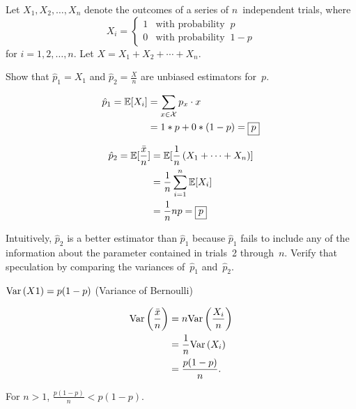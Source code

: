 \begin{problem}
  Let ${X_1,X_2,\ldots,X_n}$  denote the outcomes of a series of $n$~independent trials, where
  \begin{equation*}
    X_i =   \begin{cases}
              1 & \text{with probability }~p \\
              0 & \text{with probability }~1 - p
            \end{cases}
  \end{equation*}
  \noindent
  for ${i=1,2,\ldots,n}$. Let ${X = X_1 + X_2 + \cdots + X_n}$.
\end{problem}

\begin{subproblem}
  Show that $\hat{p}_1 = X_1$ and ${\hat{p}_2 = \frac{X}{n}}$ are unbiased estimators for~$p$.
\end{subproblem}

\begin{align*}
  \hat{p}_1 = \mathbb{E}\lbrack X_i\rbrack &= \sum_{x \in \mathcal{X}} p_x \cdot x \\
                            &= 1 * p + 0 * (1 - p) =\boxed{p}
\end{align*}

\begin{align*}
  \hat{p}_2 = \mathbb{E}\lbrack\frac{\bar{x}}{n}\rbrack &= \mathbb{E}\lbrack\frac{1}{n} \left(X_1 + \cdots + X_n\right)\rbrack \\
                                          &= \frac{1}{n} \sum_{i=1}^{n} \mathbb{E}\lbrack X_i\rbrack \\
                                          &= \frac{1}{n} np = \boxed{p}
\end{align*}

\begin{subproblem}
  Intuitively, $\hat{p}_2$ is a better estimator than $\hat{p}_1$ because $\hat{p}_1$ fails to include any of the information about the parameter contained in trials~2 through~$n$. Verify that speculation by comparing the variances of~$\hat{p}_1$ and~$\hat{p}_2$.
\end{subproblem}

$\text{Var}\left(X1\right) = p(1-p)$ (Variance of Bernoulli)

\begin{align}
  \text{Var}\left(\frac{\bar{x}}{n}\right) &= n \text{Var}\left(\frac{X_i}{n}\right) \\
                          &= \frac{1}{n} \text{Var}\left(X_i\right) \\
                          &= \frac{p(1-p)}{n} \text{.}
\end{align}

For ${n > 1}$, ${\frac{p(1-p)}{n} < p(1-p)}$.
